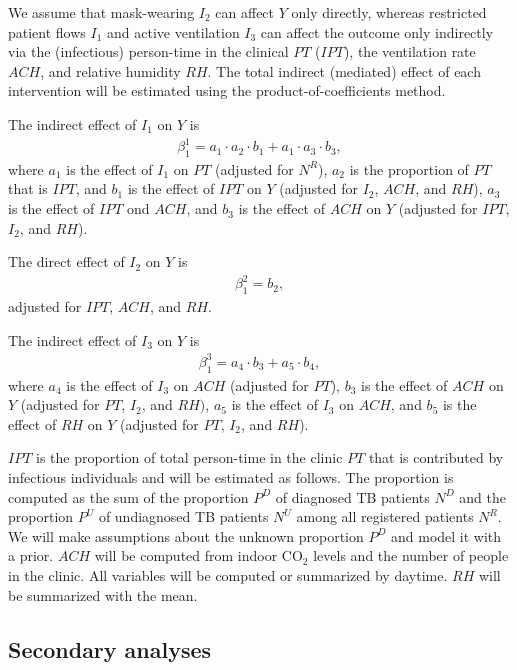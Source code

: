 \documentclass{article}
\begin{document}
We assume that mask-wearing $I_2$ can affect $Y$ only  directly, whereas restricted patient flows $I_1$ and active ventilation $I_3$ can affect the outcome only indirectly via the (infectious) person-time in the clinical $PT$ ($IPT$), the ventilation rate $ACH$, and relative humidity $RH$. The total indirect (mediated) effect of each intervention will be estimated using the product-of-coefficients method.

The indirect effect of $I_1$ on $Y$ is 
\begin{align*}
    \beta_1^1 = a_1 \cdot a_2 \cdot b_1 + a_1 \cdot a_3 \cdot b_3,
\end{align*}
where $a_1$ is the effect of $I_1$ on $PT$ (adjusted for $N^R$), $a_2$ is the proportion of $PT$ that is $IPT$, and $b_1$ is the effect of $IPT$ on $Y$ (adjusted for $I_2$, $ACH$, and $RH$), $a_3$ is the effect of $IPT$ ond $ACH$, and $b_3$ is the effect of $ACH$ on $Y$ (adjusted for $IPT$, $I_2$, and $RH$). 

The direct effect of $I_2$ on $Y$ is
\begin{align*}
    \beta_1^2 = b_2,
\end{align*}
adjusted for $IPT$, $ACH$, and $RH$.

The indirect effect of $I_3$ on $Y$ is
\begin{align*}
    \beta_1^3 = a_4 \cdot b_3 + a_5 \cdot b_4,
\end{align*}
where $a_4$ is the effect of $I_3$ on $ACH$ (adjusted for $PT$), $b_3$ is the effect of $ACH$ on $Y$ (adjusted for $PT$, $I_2$, and $RH)$, $a_5$ is the effect of $I_3$ on $ACH$, and $b_5$ is the effect of $RH$ on $Y$ (adjusted for $PT$, $I_2$, and $RH$).

$IPT$ is the proportion of total person-time in the clinic $PT$ that is contributed by infectious individuals and will be estimated as follows. The proportion is computed as the sum of the proportion $P^D$ of diagnosed TB patients $N^D$ and the proportion $P^U$ of undiagnosed TB patients $N^U$ among all registered patients $N^R$. We will make assumptions about the unknown proportion $P^D$ and model it with a prior. $ACH$ will be computed from indoor CO$_2$ levels and the number of people in the clinic. All variables will be computed or summarized by daytime. $RH$ will be summarized with the mean. 


\subsection{Secondary analyses}
\end{document}
